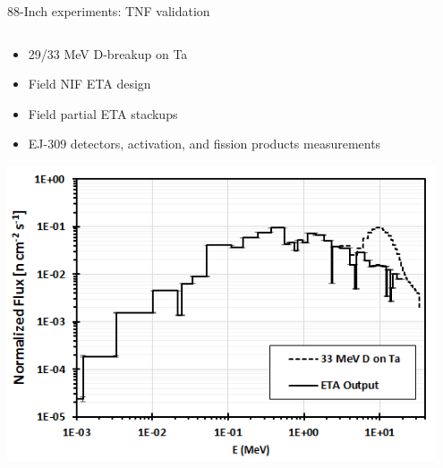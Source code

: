 \documentclass[xcolor=x11names,compress,handout]{beamer}
\renewcommand{\(}{\begin{columns}}
\renewcommand{\)}{\end{columns}}
\newcommand{\<}[1]{\begin{column}{#1}}
\renewcommand{\>}{\end{column}}
\begin{document}
\begin{frame}{88-Inch experiments: TNF validation}
      \begin{columns}
        \begin{column}{0.55\linewidth}
          \begin{itemize}
            \item 29/33 MeV D-breakup on Ta
            \item Field NIF ETA design
            \item Field partial ETA stackups
            \item EJ-309 detectors, activation, and fission products measurements 
          \end{itemize}
          \includegraphics[width=0.95\textwidth]{../figs/33MeVTa_OutputComp.png}
        \end{column}
        

\end{columns}
\end{frame}
\end{document}
